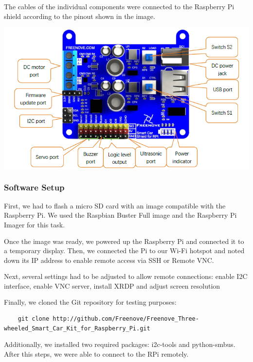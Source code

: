     \noindent
    \begin{minipage}[t]{0.63\textwidth}
        \vspace*{0pt}
        The cables of the individual components were connected to the Raspberry Pi shield according to the pinout shown in the image.
    \end{minipage}
    \hfill
    \begin{minipage}[t]{0.33\textwidth}
        \vspace*{0pt}
        \includegraphics[width=\linewidth]{img/shield_pinout}
    \end{minipage}

    \vspace{2em}


    \subsubsection{Software Setup}

    First, we had to flash a micro SD card with an image compatible with the Raspberry Pi. We used the Raspbian Buster Full image and the Raspberry Pi Imager for this task.

    Once the image was ready, we powered up the Raspberry Pi and connected it to a temporary display. Then, we connected the Pi to our Wi-Fi hotspot and noted down its IP address to enable remote access via SSH or Remote VNC.

    Next, several settings had to be adjusted to allow remote connections: enable I2C interface, enable VNC server, install XRDP and adjust screen resolution

    Finally, we cloned the Git repository for testing purposes:
    \begin{verbatim}
    git clone http://github.com/Freenove/Freenove_Three-wheeled_Smart_Car_Kit_for_Raspberry_Pi.git
    \end{verbatim}
    Additionally, we installed two required packages: i2c-tools and python-smbus.
    After this steps, we were able to connect to the RPi remotely.

